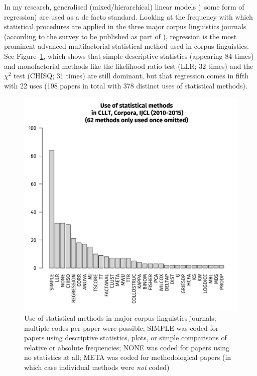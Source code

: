In my research, generalised (mixed\slash hierarchical) linear models (\ie\ some form of regression) are used as a de facto standard.
Looking at the frequency with which statistical procedures are applied in the three major corpus linguistics journals (according to the survey to be published as part of \citealt{Schaefer2019}), regression is the most prominent advanced multifactorial statistical method used in corpus linguistics.
See Figure~\ref{fig:statsuse}, which shows that simple descriptive statistics (appearing 84 times) and monofactorial methods like the likelihood ratio test (LLR; 32 times) and the $\chi^2$ test (CHISQ; 31 times) are still dominant, but that regression comes in fifth with 22 uses (198 papers in total with 378 distinct uses of statistical methods).

\begin{figure}[htpb]
  \centering
  \includegraphics[width=\textwidth]{graphics/statsuse}
  \caption{Use of statistical methods in major corpus linguistics journals; multiple codes per paper were possible; SIMPLE was coded for papers using descriptive statistics, plots, or simple comparisons of relative or absolute frequencies; NONE was coded for papers using no statistics at all; META was coded for methodological papers (in which case individual methods were \textit{not} coded)}
  \label{fig:statsuse}
\end{figure}

